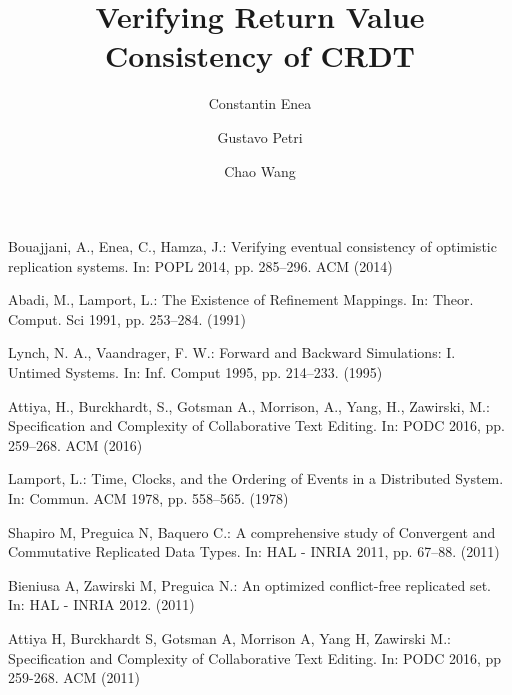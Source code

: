 \documentclass{llncs}
\title{Verifying Return Value Consistency of CRDT}
\author {Constantin Enea \and Gustavo Petri \and Chao Wang}
\institute{Institut de Recherche en Informatique Fondamentale, \\Univ. Paris Diderot (Paris 7)
}
\begin{document}
\maketitle











 



%  
%
%


\begin{thebibliography}{50}
Bouajjani, A., Enea, C., Hamza, J.:
\newblock Verifying eventual consistency of optimistic replication systems.
\newblock In: POPL 2014, pp. 285--296. ACM (2014)


Abadi, M., Lamport, L.:
\newblock The Existence of Refinement Mappings.
\newblock In: Theor. Comput. Sci 1991, pp. 253--284.  (1991)


Lynch, N. A., Vaandrager, F. W.:
\newblock Forward and Backward Simulations: I. Untimed Systems.
\newblock In: Inf. Comput 1995, pp. 214--233.  (1995)


Attiya, H., Burckhardt, S., Gotsman A., Morrison, A., Yang, H., Zawirski, M.:
\newblock Specification and Complexity of Collaborative Text Editing.
\newblock In: PODC 2016, pp. 259--268. ACM (2016)


Lamport, L.:
\newblock Time, Clocks, and the Ordering of Events in a Distributed System.
\newblock In: Commun. ACM 1978, pp. 558--565. (1978)


Shapiro M, Preguica N, Baquero C.:
\newblock A comprehensive study of Convergent and Commutative Replicated Data Types.
\newblock In: HAL - INRIA 2011, pp. 67--88. (2011)


Bieniusa A, Zawirski M, Preguica N.:
\newblock An optimized conflict-free replicated set.
\newblock In: HAL - INRIA 2012. (2011)


Attiya H, Burckhardt S, Gotsman A, Morrison A, Yang H, Zawirski M.:
\newblock Specification and Complexity of Collaborative Text Editing.
\newblock In: PODC 2016, pp 259-268. ACM (2011)
\end{thebibliography}
\newpage

\appendix


\end{document}
